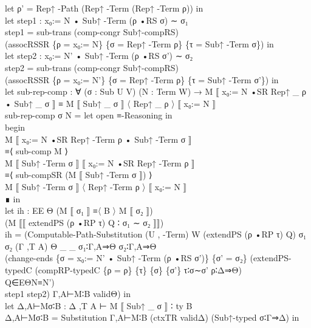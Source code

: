 {\begin{code}
{\>    let ρ' = Rep↑ -Path (Rep↑ -Term (Rep↑ -Term ρ)) in\<\\
\>    let step1 : x₀:= N • Sub↑ -Term (ρ •RS σ) ∼ σ₁\<\\
\>        step1 = sub-trans (comp-congr Sub↑-compRS) \<\\
\>                  (assocRSSR \{ρ = x₀:= N\} \{σ = Rep↑ -Term ρ\} \{τ = Sub↑ -Term σ\}) in\<\\
\>    let step2 : x₀:= N' • Sub↑ -Term (ρ •RS σ') ∼ σ₂\<\\
\>        step2 = sub-trans (comp-congr Sub↑-compRS) \<\\
\>                  (assocRSSR \{ρ = x₀:= N'\} \{σ = Rep↑ -Term ρ\} \{τ = Sub↑ -Term σ'\}) in\<\\
\>    let sub-rep-comp : ∀ (σ : Sub U V) (N : Term W) → M ⟦ x₀:= N •SR Rep↑ \_ ρ • Sub↑ \_ σ ⟧ ≡ M ⟦ Sub↑ \_ σ ⟧ 〈 Rep↑ \_ ρ 〉 ⟦ x₀:= N ⟧\<\\
\>        sub-rep-comp σ N = let open ≡-Reasoning in\<\\
\>             begin\<\\
\>               M ⟦ x₀:= N •SR Rep↑ -Term ρ • Sub↑ -Term σ ⟧\<\\
\>             ≡⟨ sub-comp M ⟩\<\\
\>               M ⟦ Sub↑ -Term σ ⟧ ⟦ x₀:= N •SR Rep↑ -Term ρ ⟧\<\\
\>             ≡⟨ sub-compSR (M ⟦ Sub↑ -Term σ ⟧) ⟩\<\\
\>               M ⟦ Sub↑ -Term σ ⟧ 〈 Rep↑ -Term ρ 〉 ⟦ x₀:= N ⟧\<\\
\>             ∎ in\<\\
\>    let ih : EE Θ (M ⟦ σ₁ ⟧ ≡〈 B 〉 M ⟦ σ₂ ⟧) \<\\
\>                  (M ⟦⟦ extendPS (ρ •RP τ) Q ∶ σ₁ ∼ σ₂ ⟧⟧)\<\\
\>        ih = (Computable-Path-Substitution (U , -Term) W (extendPS (ρ •RP τ) Q) σ₁ σ₂ (Γ ,T A) Θ \_ \_ σ₁∶Γ,A⇒Θ σ₂∶Γ,A⇒Θ\<\\
\>             (change-ends \{σ = x₀:= N' • Sub↑ -Term (ρ •RS σ')\} \{σ' = σ₂\} (extendPS-typedC (compRP-typedC \{ρ = ρ\} \{τ\} \{σ\} \{σ'\} τ∶σ∼σ' ρ∶Δ⇒Θ) \<\\
\>               Q∈EΘN≡N')\<\\
\>                 step1 step2) Γ,A⊢M∶B validΘ) in\<\\
\>    let Δ,A⊢Mσ∶B : Δ ,T A ⊢ M ⟦ Sub↑ \_ σ ⟧ ∶ ty B\<\\
\>        Δ,A⊢Mσ∶B = Substitution Γ,A⊢M∶B (ctxTR validΔ) (Sub↑-typed σ∶Γ⇒Δ) in\<\\
}
\end{code}}
